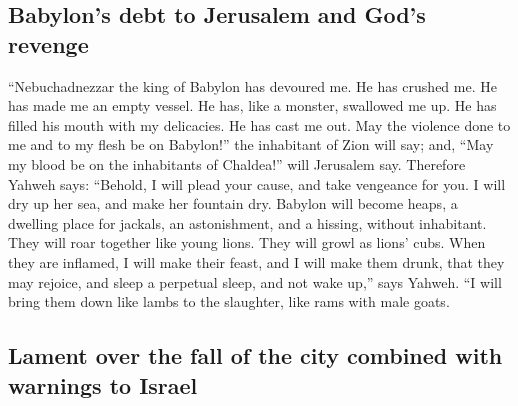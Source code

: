 \begin{paracol}{2}
\begin{otherlanguage}{english}
\hypertarget{babylons-debt-to-jerusalem-and-gods-revenge}{%
\subsection{Babylon's debt to Jerusalem and God's
revenge}\label{babylons-debt-to-jerusalem-and-gods-revenge}}

 ``Nebuchadnezzar the king of Babylon has devoured me. He
has crushed me. He has made me an empty vessel. He has, like a monster,
swallowed me up. He has filled his mouth with my delicacies. He has cast
me out.  May the violence done to me and to my flesh be
on Babylon!'' the inhabitant of Zion will say; and, ``May my blood be on
the inhabitants of Chaldea!'' will Jerusalem say. 
Therefore Yahweh says: ``Behold, I will plead your cause, and take
vengeance for you. I will dry up her sea, and make her fountain dry.
 Babylon will become heaps, a dwelling place for jackals,
an astonishment, and a hissing, without inhabitant.  They
will roar together like young lions. They will growl as lions' cubs.
 When they are inflamed, I will make their feast, and I
will make them drunk, that they may rejoice, and sleep a perpetual
sleep, and not wake up,'' says Yahweh.  ``I will bring
them down like lambs to the slaughter, like rams with male goats.

\hypertarget{lament-over-the-fall-of-the-city-combined-with-warnings-to-israel}{%
\subsection{Lament over the fall of the city combined with warnings to
Israel}\label{lament-over-the-fall-of-the-city-combined-with-warnings-to-israel}}


\end{otherlanguage}
\end{paracol}
